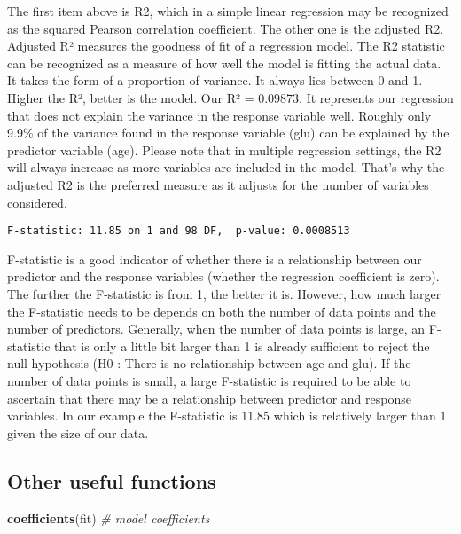 \documentclass[]{book}
\newenvironment{Shaded}{\begin{snugshade}}{\end{snugshade}}
\newcommand{\KeywordTok}[1]{\textcolor[rgb]{0.13,0.29,0.53}{\textbf{#1}}}
\newcommand{\CommentTok}[1]{\textcolor[rgb]{0.56,0.35,0.01}{\textit{#1}}}
\newcommand{\NormalTok}[1]{#1}
\theoremstyle{definition}
\theoremstyle{definition}
\theoremstyle{definition}
\theoremstyle{remark}
\begin{document}
The first item above is R2, which in a simple linear regression may be
recognized as the squared Pearson correlation coefficient. The other one
is the adjusted R2. Adjusted R² measures the goodness of fit of a
regression model. The R2 statistic can be recognized as a measure of how
well the model is fitting the actual data. It takes the form of a
proportion of variance. It always lies between 0 and 1. Higher the R²,
better is the model. Our R² = 0.09873. It represents our regression that
does not explain the variance in the response variable well. Roughly
only 9.9\% of the variance found in the response variable (glu) can be
explained by the predictor variable (age). Please note that in multiple
regression settings, the R2 will always increase as more variables are
included in the model. That's why the adjusted R2 is the preferred
measure as it adjusts for the number of variables considered.

\begin{verbatim}
F-statistic: 11.85 on 1 and 98 DF,  p-value: 0.0008513
\end{verbatim}

F-statistic is a good indicator of whether there is a relationship
between our predictor and the response variables (whether the regression
coefficient is zero). The further the F-statistic is from 1, the better
it is. However, how much larger the F-statistic needs to be depends on
both the number of data points and the number of predictors. Generally,
when the number of data points is large, an F-statistic that is only a
little bit larger than 1 is already sufficient to reject the null
hypothesis (H0 : There is no relationship between age and glu). If the
number of data points is small, a large F-statistic is required to be
able to ascertain that there may be a relationship between predictor and
response variables. In our example the F-statistic is 11.85 which is
relatively larger than 1 given the size of our data.

\subsection{Other useful functions}\label{other-useful-functions-1}

\begin{Shaded}
\begin{Highlighting}[]
\KeywordTok{coefficients}\NormalTok{(fit) }\CommentTok{# model coefficients}
\end{Highlighting}
\end{Shaded}
\end{document}
